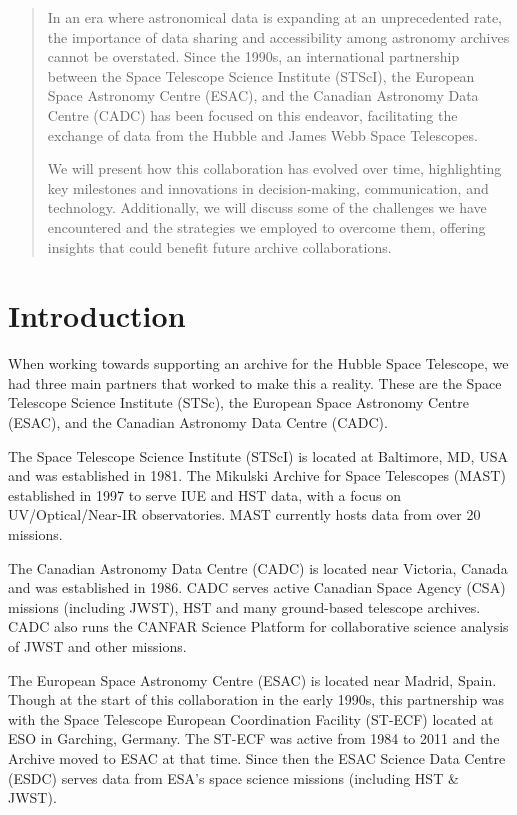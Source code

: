 \documentclass[11pt,twoside]{article}
\begin{document}


\begin{abstract}
In an era where astronomical data is expanding at an unprecedented rate, the importance of data sharing and accessibility among astronomy archives cannot be overstated. 
Since the 1990s, an international partnership between the Space Telescope Science Institute (STScI), the European Space Astronomy Centre (ESAC), 
and the Canadian Astronomy Data Centre (CADC) has been focused on this endeavor, facilitating the exchange of data from the Hubble and James Webb Space Telescopes.

We will present how this collaboration has evolved over time, highlighting key milestones and innovations in decision-making, communication, and technology. 
Additionally, we will discuss some of the challenges we have encountered and the strategies we employed to overcome them, offering insights that could benefit future archive collaborations.
\end{abstract}

\section{Introduction}

When working towards supporting an archive for the Hubble Space Telescope, we had three main partners that worked to make this a reality.
These are the Space Telescope Science Institute (STSc), the European Space Astronomy Centre (ESAC), and the Canadian Astronomy Data Centre (CADC).

The Space Telescope Science Institute (STScI) is located at Baltimore, MD, USA and was established in 1981.
The Mikulski Archive for Space Telescopes (MAST) established in 1997 to serve IUE and HST data, with a focus on UV/Optical/Near-IR observatories. MAST currently hosts data from over 20 missions.

The Canadian Astronomy Data Centre (CADC) is located near Victoria, Canada and was established in 1986.
CADC serves active Canadian Space Agency (CSA) missions (including JWST), HST and many ground-based telescope archives.
CADC also runs the CANFAR Science Platform for collaborative science analysis of JWST and other missions.

The European Space Astronomy Centre (ESAC) is located near Madrid, Spain. Though at the start of this collaboration in the early 1990s, this partnership was with the Space Telescope European Coordination Facility (ST-ECF) located at ESO in Garching, Germany. 
The ST-ECF was active from 1984 to 2011 and the Archive moved to ESAC at that time. 
Since then the ESAC Science Data Centre (ESDC) serves data from ESA's space science missions (including HST \& JWST).
\end{document}
